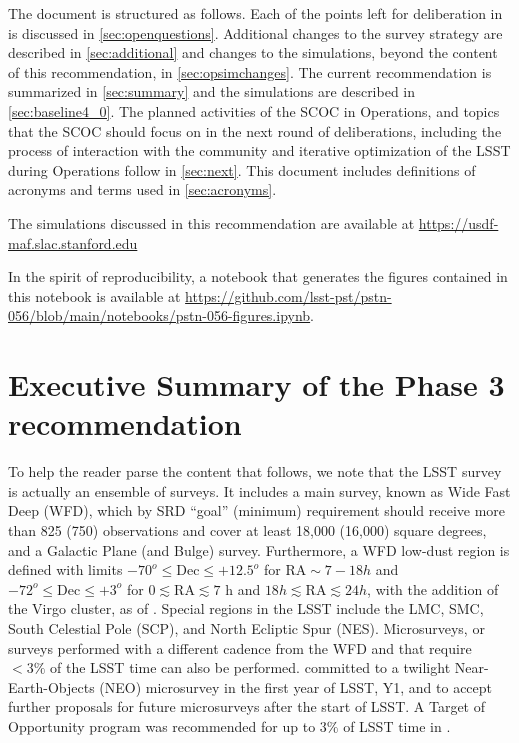 The document is structured as follows.
Each of the points left for deliberation in   is discussed in \autoref{sec:openquestions}.
Additional changes to the survey strategy are described in \autoref{sec:additional} and changes to the simulations, beyond the content of this recommendation, in \autoref{sec:opsimchanges}.
The current recommendation is summarized in \autoref{sec:summary} and the  simulations are described in \autoref{sec:baseline4_0}.
The planned activities of the SCOC in Operations, and topics that the SCOC should focus on in the next round of deliberations, including the process of interaction with the community and iterative optimization of the LSST during Operations follow in \autoref{sec:next}.
This document includes definitions of acronyms and terms used in \autoref{sec:acronyms}.

The simulations discussed in this recommendation are available at \url{https://usdf-maf.slac.stanford.edu}

In the spirit of reproducibility, a notebook that generates the figures contained in this notebook is available at \url{https://github.com/lsst-pst/pstn-056/blob/main/notebooks/pstn-056-figures.ipynb}.

\clearpage

\section{Executive Summary of the Phase 3 recommendation}


To help the reader parse the content that follows, we note that the LSST survey is actually an ensemble of surveys. It includes a main survey, known as Wide Fast Deep (WFD), which by SRD ``goal'' (minimum) requirement should receive more than 825 (750) observations and cover at least 18,000 (16,000) square degrees, and a Galactic Plane (and Bulge) survey. Furthermore, a WFD low-dust region is defined with limits $-70^o \leq \mathrm{Dec} \leq +12.5^o$ for
$\mathrm{RA} \sim   7-18 h$ and $-72^o \leq \mathrm{Dec}\leq +3^o$
for $0 \lesssim \mathrm{RA} \lesssim 7$ h and $18 h \lesssim \mathrm{RA} \lesssim 24 h$, with the addition of the Virgo cluster, as of .  Special regions in the LSST include the LMC, SMC, South Celestial Pole (SCP), and North Ecliptic Spur (NES). Microsurveys, or surveys performed with a different cadence from the WFD and that require $<3\%$ of the LSST time can also be performed.  committed to a twilight Near-Earth-Objects (NEO) microsurvey in the first year of LSST, Y1, and to accept further proposals for future microsurveys after the start of LSST. A Target of Opportunity program was recommended for up to $3\%$ of LSST time in .

